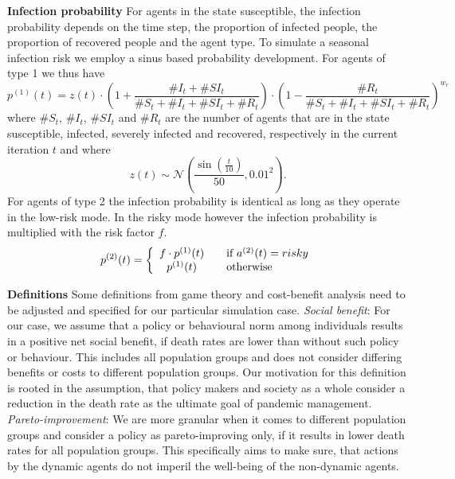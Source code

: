 \documentclass[]{article}
\begin{document}
\textbf{Infection probability}\newline
For agents in the state susceptible, the infection probability depends on the time step, the proportion of infected people, the proportion of recovered people and the agent type. To simulate a seasonal infection risk we employ a sinus based probability development. For agents of type 1 we thus have
$$p^{(1)}(t) = z(t) \cdot \left(1+\frac{\#I_t+\#SI_t}{\#S_t+\#I_t+\#SI_t+\#R_t}\right) \cdot \left(1-\frac{\#R_t}{\#S_t+\#I_t+\#SI_t+\#R_t}\right)^{w_r}$$
where $\#S_t$, $\#I_t$, $\#SI_t$ and $\#R_t$ are the number of agents that are in the state susceptible, infected, severely infected and recovered, respectively in the current iteration $t$ and where
$$z(t) \sim \mathcal{N}\left(\frac{\sin(\frac{t}{10})}{50}, 0.01^2\right).$$
For agents of type 2 the infection probability is identical as long as they operate in the low-risk mode. In the risky mode however the infection probability is multiplied with the risk factor $f$.
$$p^{(2)}(t) = \left\{ 
  \begin{array}{ c l }
    f \cdot p^{(1)}(t) & \quad \textrm{if } a^{(2)}(t)=risky \\
    p^{(1)}(t)                 & \quad \textrm{otherwise}
  \end{array}
\right.$$


\textbf{Definitions}\newline
Some definitions from game theory and cost-benefit analysis need to be adjusted and specified for our particular simulation case. \newline
\textit{Social benefit}: For our case, we assume that a policy or behavioural norm among individuals results in a positive net social benefit, if death rates are lower than without such policy or behaviour. This includes all population groups and does not consider differing benefits or costs to different population groups. Our motivation for this definition is rooted in the assumption, that policy makers and society as a whole consider a reduction in the death rate as the ultimate goal of pandemic management.  \newline
\textit{Pareto-improvement}: We are more granular when it comes to different population groups and consider a policy as pareto-improving only, if it results in lower death rates for all population groups. This specifically aims to make sure, that actions by the dynamic agents do not imperil the well-being of the non-dynamic agents. 
\end{document}
